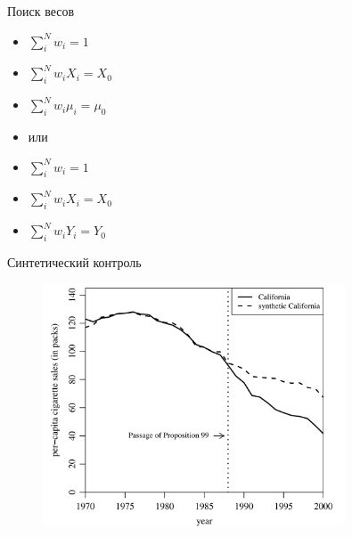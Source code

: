 \begin{frame}{Поиск весов}
    \begin{itemize}
        \item $\sum^N_iw_i = 1$
        \item $\sum^N_iw_iX_i = X_0$
        \item $\sum^N_iw_i\mu_i = \mu_0$
        \pause
        \item<+-> или
    \end{itemize}
    \pause
    \begin{itemize}
        \item $\sum^N_iw_i = 1$
        \item $\sum^N_iw_iX_i = X_0$
        \item $\sum^N_iw_iY_i = Y_0$
    \end{itemize}
    
    \pause
\end{frame}


\begin{frame}{Синтетический контроль}
\begin{figure}
    \centering
    \includegraphics[width=0.8\textwidth]{Images/california_synth.png}
\end{figure}
\end{frame}

